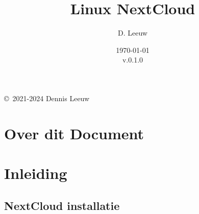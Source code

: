 \documentclass[a4paper,12pt,twoside,openright,titlepage]{book}
\author{D. Leeuw}
\title{Linux NextCloud}
\date{\today\\v.0.1.0}
\begin{document}

\maketitle

\copyright\ 2021-2024 Dennis Leeuw\\




\frontmatter
\chapter{Over dit Document}

\tableofcontents

\mainmatter
\chapter{Inleiding}

\section{NextCloud installatie}



\printindex
\end{document}
